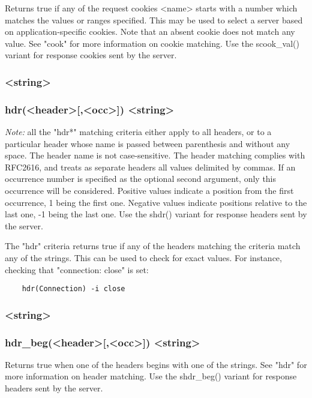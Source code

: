   Returns true if any of the request cookies <name> starts with a number which
  matches the values or ranges specified. This may be used to select a server
  based on application-specific cookies. Note that an absent cookie does not
  match any value. See "cook" for more information on cookie matching. Use the
  scook\_val() variant for response cookies sent by the server.

\subsubsection[hdr]{ <string>}
\subsubsection*{hdr(<header>[,<occ>]) <string>}

  \emph{Note:} all the "hdr*" matching criteria either apply to all headers, or to a
  particular header whose name is passed between parenthesis and without any
  space. The header name is not case-sensitive. The header matching complies
  with RFC2616, and treats as separate headers all values delimited by commas.
  If an occurrence number is specified as the optional second argument, only
  this occurrence will be considered. Positive values indicate a position from
  the first occurrence, 1 being the first one. Negative values indicate
  positions relative to the last one, -1 being the last one. Use the shdr()
  variant for response headers sent by the server.

  The "hdr" criteria returns true if any of the headers matching the criteria
  match any of the strings. This can be used to check for exact values. For
  instance, checking that "connection: close" is set:
  \begin{verbatim}
    hdr(Connection) -i close
  \end{verbatim}
     
\subsubsection[hdr\_beg]{ <string>}
\subsubsection*{hdr\_beg(<header>[,<occ>]) <string>}

  Returns true when one of the headers begins with one of the strings. See
  "hdr" for more information on header matching. Use the shdr\_beg() variant for
  response headers sent by the server.

